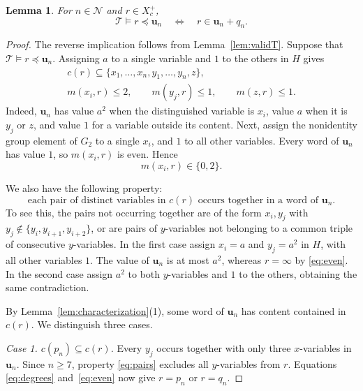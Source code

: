 \documentclass[11pt,reqno]{amsart}
\newtheorem{lemma}[theorem]{Lemma}
\theoremstyle{remark}
\newcommand{\T}{\mathcal T}
\newcommand{\Ncal}{\mathcal N}
\newcommand{\bu}{\mathbf u}
\numberwithin{equation}{section}
\begin{document}
\begin{lemma}\label{lem:word}
For $n\in\Ncal$ and $r\in X_c^+$,
\[
\T\models r\preceq\bu_n
\quad\Longleftrightarrow\quad
r\in\bu_n+q_n.
\]
\end{lemma}
\begin{proof}
The reverse implication follows from Lemma~\ref{lem:validT}. Suppose that
$\T\models r\preceq\bu_n$. Assigning $a$ to a single variable and $1$
to the others in $H$ gives
\begin{equation}\label{eq:degrees}
\begin{gathered}
c(r)\subseteq\{x_1,\ldots,x_n,y_1,\ldots,y_n,z\},\\
m(x_i,r)\leq2,\qquad m(y_j,r)\leq1,\qquad m(z,r)\leq1.
\end{gathered}
\end{equation}
Indeed, $\bu_n$ has value $a^2$ when the distinguished variable is $x_i$,
value $a$ when it is $y_j$ or $z$, and value $1$ for a variable outside
its content. Next, assign the nonidentity group element of $G_2$ to a
single $x_i$, and $1$ to all other variables. Every word of $\bu_n$
has value $1$, so $m(x_i,r)$ is even. Hence
\begin{equation}\label{eq:even}
m(x_i,r)\in\{0,2\}.
\end{equation}

We also have the following property:
\begin{equation}\label{eq:pairs}
\text{each pair of distinct variables in $c(r)$ occurs together in a word of $\bu_n$.}
\end{equation}
To see this, the pairs not occurring together are of the form $x_i,y_j$
with $y_j\notin\{y_i,y_{i+1},y_{i+2}\}$, or are pairs of $y$-variables
not belonging to a common triple of consecutive $y$-variables. In the
first case assign $x_i=a$ and $y_j=a^2$ in $H$, with all other variables
$1$. The value of $\bu_n$ is at most $a^2$, whereas $r=\infty$ by
\eqref{eq:even}. In the second case assign $a^2$ to both $y$-variables
and $1$ to the others, obtaining the same contradiction.

By Lemma~\ref{lem:characterization}(1), some word of $\bu_n$ has content
contained in $c(r)$. We distinguish three cases.

\emph{Case 1. $c(p_n)\subseteq c(r)$.} Every $y_j$ occurs together with
only three $x$-variables in $\bu_n$. Since $n\geq7$, property
\eqref{eq:pairs} excludes all $y$-variables from $r$. Equations
\eqref{eq:degrees} and~\eqref{eq:even} now give $r=p_n$ or $r=q_n$.


\end{proof}
\end{document}
